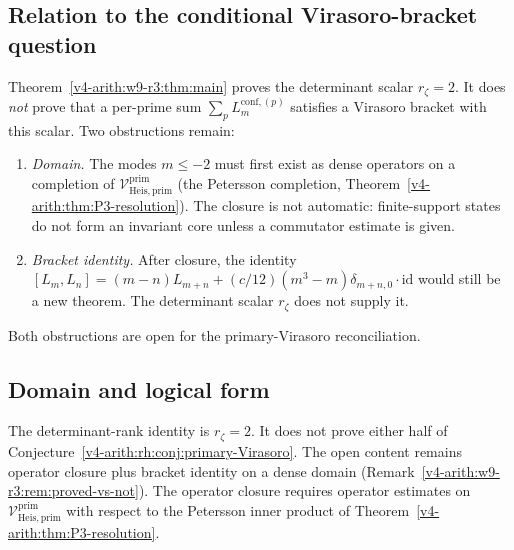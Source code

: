 \subsection{Relation to the conditional Virasoro-bracket question}
\label{v4-arith:w9-r3:bracket-relation}

\begin{remark}
\label{v4-arith:w9-r3:rem:proved-vs-not}
Theorem~\ref{v4-arith:w9-r3:thm:main} proves the determinant scalar
\(r_{\zeta}=2\). It does \emph{not} prove that a per-prime sum
\(\sum_{p}L_{m}^{\mathrm{conf},(p)}\) satisfies a Virasoro bracket
with this scalar. Two obstructions remain:
\begin{enumerate}
\item \emph{Domain.} The modes \(m\leq -2\) must first exist as
dense operators on a completion of
\(\mathcal{V}^{\mathrm{prim}}_{\mathrm{Heis},\mathrm{prim}}\) (the
Petersson completion, Theorem~\ref{v4-arith:thm:P3-resolution}). The
closure is not automatic: finite-support states do not form an
invariant core unless a commutator estimate is given.
\item \emph{Bracket identity.} After closure, the identity
\([L_{m},L_{n}]=(m-n)L_{m+n}+(c/12)(m^{3}-m)\delta_{m+n,0}\cdot\mathrm{id}\)
would still be a new theorem. The determinant scalar \(r_{\zeta}\)
does not supply it.
\end{enumerate}
Both obstructions are open for the primary-Virasoro reconciliation.
\end{remark}

\subsection{Domain and logical form}
\label{v4-arith:w9-r3:domain}

\begin{remark}
\label{v4-arith:w9-r3:rem:domain}
The determinant-rank identity is \(r_{\zeta}=2\).
It does not prove either half of
Conjecture~\ref{v4-arith:rh:conj:primary-Virasoro}. The open content remains
operator closure plus bracket identity on a dense domain
(Remark~\ref{v4-arith:w9-r3:rem:proved-vs-not}). The operator closure
requires operator estimates on
\(\mathcal{V}^{\mathrm{prim}}_{\mathrm{Heis},\mathrm{prim}}\) with
respect to the Petersson inner product of
Theorem~\ref{v4-arith:thm:P3-resolution}.
\end{remark}

